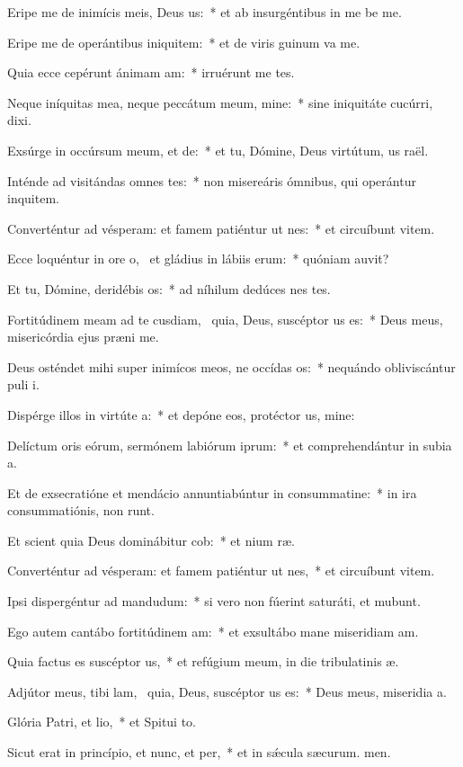 \item Eripe me de inimícis meis, Deus us:~* et ab insurgéntibus in me be me.
\item Eripe me de operántibus iniquitem:~* et de viris guinum va me.
\item Quia ecce cepérunt ánimam am:~* irruérunt  me tes.
\item Neque iníquitas mea, neque peccátum meum, mine:~* sine iniquitáte cucúrri,  dixi.
\item Exsúrge in occúrsum meum, et de:~* et tu, Dómine, Deus virtútum, us raël.
\item Inténde ad visitándas omnes tes:~* non misereáris ómnibus, qui operántur inquitem.
\item Converténtur ad vésperam: et famem patiéntur ut nes:~* et circuíbunt vitem.
\item Ecce loquéntur in ore o,~\pscross{} et gládius in lábiis erum:~* quóniam  auvit?
\item Et tu, Dómine, deridébis os:~* ad níhilum dedúces nes tes.
\item Fortitúdinem meam ad te cusdiam,~\pscross{} quia, Deus, suscéptor us es:~* Deus meus, misericórdia ejus præni me.
\item Deus osténdet mihi super inimícos meos, ne occídas os:~* nequándo obliviscántur puli i.
\item Dispérge illos in virtúte a:~* et depóne eos, protéctor us, mine:
\item Delíctum oris eórum, sermónem labiórum iprum:~* et comprehendántur in subia a.
\item Et de exsecratióne et mendácio annuntiabúntur in consummatine:~* in ira consummatiónis,  non runt.
\item Et scient quia Deus dominábitur cob:~* et nium ræ.
\item Converténtur ad vésperam: et famem patiéntur ut nes,~* et circuíbunt vitem.
\item Ipsi dispergéntur ad mandudum:~* si vero non fúerint saturáti, et mubunt.
\item Ego autem cantábo fortitúdinem am:~* et exsultábo mane miseridiam am.
\item Quia factus es suscéptor us,~* et refúgium meum, in die tribulatinis æ.
\item Adjútor meus, tibi lam,~\pscross{} quia, Deus, suscéptor us es:~* Deus meus, miseridia a.
\item Glória Patri, et lio,~* et Spitui to.
\item Sicut erat in princípio, et nunc, et per,~* et in sǽcula sæcurum. men.
